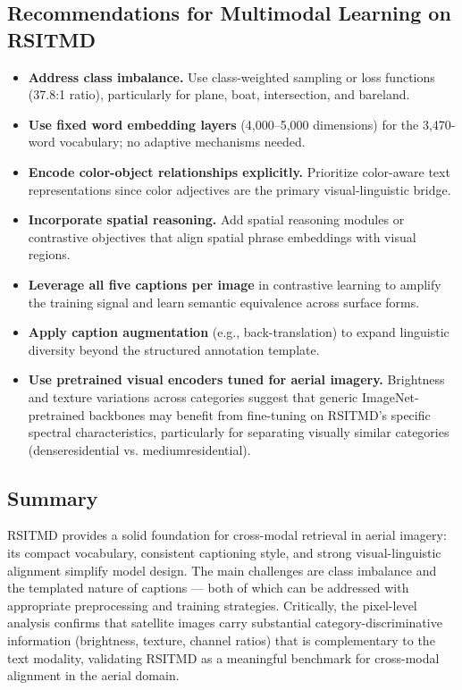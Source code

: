 \subsection{Recommendations for Multimodal Learning on RSITMD}

\begin{itemize}
    \item \textbf{Address class imbalance.} Use class-weighted sampling or loss functions (37.8:1 ratio), particularly for plane, boat, intersection, and bareland.

    \item \textbf{Use fixed word embedding layers} (4,000--5,000 dimensions) for the 3,470-word vocabulary; no adaptive mechanisms needed.

    \item \textbf{Encode color-object relationships explicitly.} Prioritize color-aware text representations since color adjectives are the primary visual-linguistic bridge.

    \item \textbf{Incorporate spatial reasoning.} Add spatial reasoning modules or contrastive objectives that align spatial phrase embeddings with visual regions.

    \item \textbf{Leverage all five captions per image} in contrastive learning to amplify the training signal and learn semantic equivalence across surface forms.

    \item \textbf{Apply caption augmentation} (e.g., back-translation) to expand linguistic diversity beyond the structured annotation template.

    \item \textbf{Use pretrained visual encoders tuned for aerial imagery.} Brightness and texture variations across categories suggest that generic ImageNet-pretrained backbones may benefit from fine-tuning on RSITMD's specific spectral characteristics, particularly for separating visually similar categories (denseresidential vs. mediumresidential).
\end{itemize}

\subsection{Summary}

RSITMD provides a solid foundation for cross-modal retrieval in aerial imagery: its compact vocabulary, consistent captioning style, and strong visual-linguistic alignment simplify model design. The main challenges are class imbalance and the templated nature of captions --- both of which can be addressed with appropriate preprocessing and training strategies. Critically, the pixel-level analysis confirms that satellite images carry substantial category-discriminative information (brightness, texture, channel ratios) that is complementary to the text modality, validating RSITMD as a meaningful benchmark for cross-modal alignment in the aerial domain.
